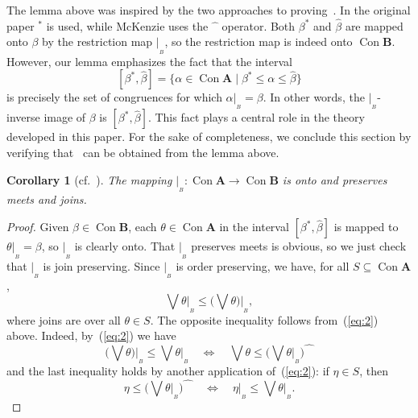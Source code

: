 \documentclass{au}
\numberwithin{equation}{section}
\theoremstyle{plain}
\newtheorem{corollary}[theorem]{Corollary}
\theoremstyle{definition}
\newcommand{\suchthat}{\ensuremath{\mid}}  %
\newcommand{\<}{\ensuremath{\langle}}
\renewcommand{\>}{\ensuremath{\rangle}}
\newcommand{\bA}{\ensuremath{\mathbf{A}}}
\newcommand{\bB}{\ensuremath{\mathbf{B}}}
\DeclareMathOperator{\Con}{Con}
\renewcommand{\leq}{\ensuremath{\leqslant}}
\newcommand{\join}{\ensuremath{\vee}}
\renewcommand{\Join}{\ensuremath{\bigvee}}
\newcommand{\resB}{\ensuremath{|_{_B}}}
\newcommand{\hatmap}{\ensuremath{\widehat{\phantom{x}}}} %
\begin{document}
The lemma above was inspired by the two approaches to
proving~\cite[Lemma~1]{Palfy:1980}.  In the original paper $^*$ is used, while
McKenzie uses the $\hatmap$ operator.  Both $\beta^*$ and
$\widehat{\beta}$ are mapped onto $\beta$ by the restriction map $\resB$, so
the restriction map is indeed onto $\Con\bB$.
However, our lemma emphasizes the fact that the interval
\[
[\beta^*, \widehat{\beta}] =
\{\alpha \in \Con\bA \suchthat \beta^* \leq \alpha \leq \widehat{\beta}\}
\]
is precisely the set of congruences for
which $\alpha\resB = \beta$.  In other words, the
$\resB$-inverse image of $\beta$ is
$[\beta^*, \widehat{\beta}]$.
This fact plays a central role in the
theory developed in this  paper.
For the sake of completeness, we conclude this section by
verifying that~\cite[Lemma~1]{Palfy:1980} can be obtained from the lemma above.
\begin{corollary}%
[cf.~{\cite[Lemma 1]{Palfy:1980}}]
The mapping  $\resB \colon  \Con\bA \rightarrow \Con\bB$ is onto and preserves meets and joins.
\end{corollary}
\begin{proof}
  Given $\beta\in \Con\bB$, each $\theta\in \Con\bA$ in the interval $[\beta^*,
  \widehat{\beta}]$ is mapped to $\theta\resB = \beta$, so $\resB$ is clearly
  onto.  That $\resB$ preserves meets is obvious, so we just check that $\resB$ is
%
%
  join preserving.  Since $\resB$ is order preserving, we have, for all 
$S \subseteq \Con\bA$,
\[
\Join \theta\resB \leq \bigl(\Join \theta\bigr)\resB,
\]
where joins are over all $\theta \in S$.  The opposite inequality follows
from~(\ref{eq:2}) above. Indeed, by~(\ref{eq:2}) we have
\[
\bigl(\Join \theta\bigr)\resB \leq \Join \theta\resB
\quad \Longleftrightarrow \quad
\Join \theta \leq \bigl(\Join \theta\resB \bigr)\!\widehat{\phantom{X}}
\]
and the last inequality holds by another application of~(\ref{eq:2}): if $\eta \in S$, then
\[
\eta \leq \bigl(\Join \theta\resB\bigr)\!\widehat{\phantom{X}}
\quad \Longleftrightarrow \quad
\eta\resB \leq \Join \theta\resB.
\]


\end{proof}
\end{document}
